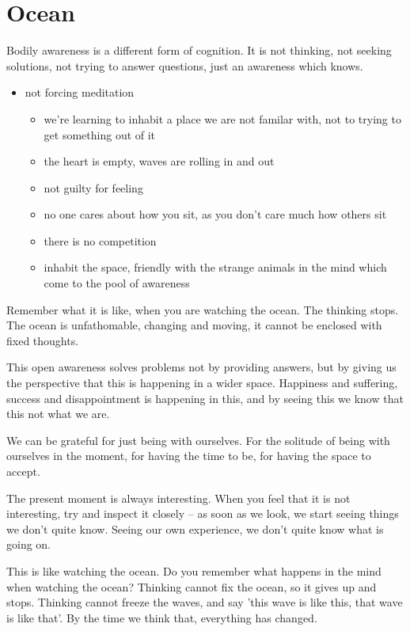 \hypertarget{ocean-1}{%
\chapter{Ocean}\label{ocean-1}}

Bodily awareness is a different form of cognition. It is not thinking,
not seeking solutions, not trying to answer questions, just an awareness
which knows.

\begin{itemize}
\tightlist
\item
  not forcing meditation

  \begin{itemize}
  \tightlist
  \item
    we're learning to inhabit a place we are not familar with, not to
    trying to get something out of it
  \item
    the heart is empty, waves are rolling in and out
  \item
    not guilty for feeling
  \item
    no one cares about how you sit, as you don't care much how others
    sit
  \item
    there is no competition
  \item
    inhabit the space, friendly with the strange animals in the mind
    which come to the pool of awareness
  \end{itemize}
\end{itemize}

Remember what it is like, when you are watching the ocean. The thinking
stops. The ocean is unfathomable, changing and moving, it cannot be
enclosed with fixed thoughts.

This open awareness solves problems not by providing answers, but by
giving us the perspective that this is happening in a wider space.
Happiness and suffering, success and disappointment is happening in
this, and by seeing this we know that this not what we are.

We can be grateful for just being with ourselves. For the solitude of
being with ourselves in the moment, for having the time to be, for
having the space to accept.

The present moment is always interesting. When you feel that it is not
interesting, try and inspect it closely -- as soon as we look, we start
seeing things we don't quite know. Seeing our own experience, we don't
quite know what is going on.

This is like watching the ocean. Do you remember what happens in the
mind when watching the ocean? Thinking cannot fix the ocean, so it gives
up and stops. Thinking cannot freeze the waves, and say 'this wave is
like this, that wave is like that'. By the time we think that,
everything has changed.

